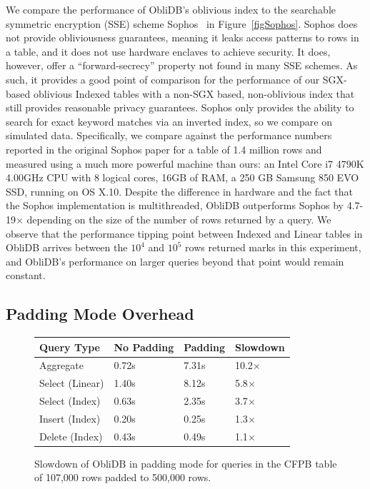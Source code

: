 \documentclass[letterpaper,twocolumn,10pt]{article}
\def\name/{ObliDB}
\begin{document}
We compare the performance of \name/'s oblivious index to the searchable symmetric encryption (SSE) scheme Sophos~\cite{Bost16} in Figure~\ref{figSophos}. Sophos does not provide obliviousness guarantees, meaning it leaks access patterns to rows in a table, and it does not use hardware enclaves to achieve security. It does, however, offer a ``forward-secrecy'' property not found in many SSE schemes. As such, it provides a good point of comparison for the performance of our SGX-based oblivious Indexed tables with a non-SGX based, non-oblivious index that still provides reasonable privacy guarantees. Sophos only provides the ability to search for exact keyword matches via an inverted index, so we compare on simulated data. Specifically, we compare against the performance numbers reported in the original Sophos paper for a table of 1.4 million rows and measured using a much more powerful machine than ours: an Intel Core i7 4790K 4.00GHz CPU with 8 logical cores, 16GB of RAM, a 250 GB Samsung 850 EVO SSD, running on OS X.10. Despite the difference in hardware and the fact that the Sophos implementation is multithreaded, \name/ outperforms Sophos by 4.7-19$\times$ depending on the size of the number of rows returned by a query. We observe that the performance tipping point between Indexed and Linear tables in \name/ arrives between the $10^4$ and $10^5$ rows returned marks in this experiment, and \name/'s performance on larger queries beyond that point would remain constant. 

\subsection{Padding Mode Overhead}
\begin{figure}
\small
\centering
\begin{tabular}{llll}
\textbf{Query Type} & \textbf{No Padding} & \textbf{Padding} & \textbf{Slowdown} \\\hline
Aggregate & 0.72s & 7.31s & 10.2$\times$\\
Select (Linear) & 1.40s & 8.12s & 5.8$\times$\\
Select (Index) & 0.63s & 2.35s & 3.7$\times$\\
Insert (Index) & 0.20s & 0.25s & 1.3$\times$\\
Delete (Index) & 0.43s & 0.49s & 1.1$\times$\\
\end{tabular}
\caption{Slowdown of \name/ in padding mode for queries in the CFPB table of 107,000 rows padded to 500,000 rows.}
\label{figPad}
\end{figure}
\end{document}
